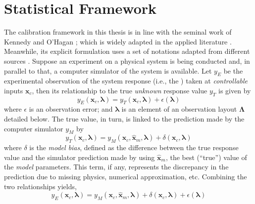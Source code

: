 \section{Statistical Framework}\label{sec:bc_statistical_framework}

The calibration framework in this thesis is in line with the seminal work of Kennedy and O'Hagan \cite{Kennedy2001};
which is widely adapted in the applied literature \cite{Bayarri2007,Higdon2008,Arendt2012,Reichert2012}.
Meanwhile, its explicit formulation uses a set of notations adapted from different sources \cite{Kennedy2001,Santner2003,Huard2006,Reichert2012,Wicaksono2016}.
Suppose an experiment on a physical system is being conducted and, in parallel to that, a computer simulator of the system is available.
Let $y_E$ be the experimental observation of the system response (i.e., the ) taken at \emph{controllable} inputs $\bm{x}_c$,
then its relationship to the true \emph{unknown} response value $y_T$ is given by
\begin{equation}
    y_E(\bm{x}_c, \bm{\lambda}) = y_T (\bm{x}_c, \bm{\lambda}) + \epsilon(\bm{\lambda})
\label{eq:bc_observation_true}
\end{equation}
where $\epsilon$ is an observation error;
and $\boldsymbol{\lambda}$ is an element of an observation layout $\boldsymbol{\Lambda}$ detailed below.
The true value, in turn, is linked to the prediction made by the computer simulator $y_M$ by
\begin{equation}
    y_T(\bm{x}_c, \boldsymbol{\lambda}) = y_M (\bm{x}_c, \hat{\bm{x}}_m, \boldsymbol{\lambda}) + \delta (\bm{x}_c, \boldsymbol{\lambda})
\label{eq:bc_true_simulation}
\end{equation}
where $\delta$ is the \emph{model bias}, defined as the difference between the true response value and the simulator prediction made by using $\hat{\bm{x}}_m$, the best (``true'') value of the \emph{model} parameters.
This term, if any, represents the discrepancy in the prediction due to missing physics, numerical approximation, etc. 
Combining the two relationships yields,
\begin{equation}
    y_E(\bm{x}_c, \boldsymbol{\lambda}) = y_M (\bm{x}_c, \hat{\bm{x}}_m, \boldsymbol{\lambda}) + \delta (\bm{x}_c, \boldsymbol{\lambda}) + \epsilon(\bm{\lambda})
\label{eq:bc_observation_true}
\end{equation}
